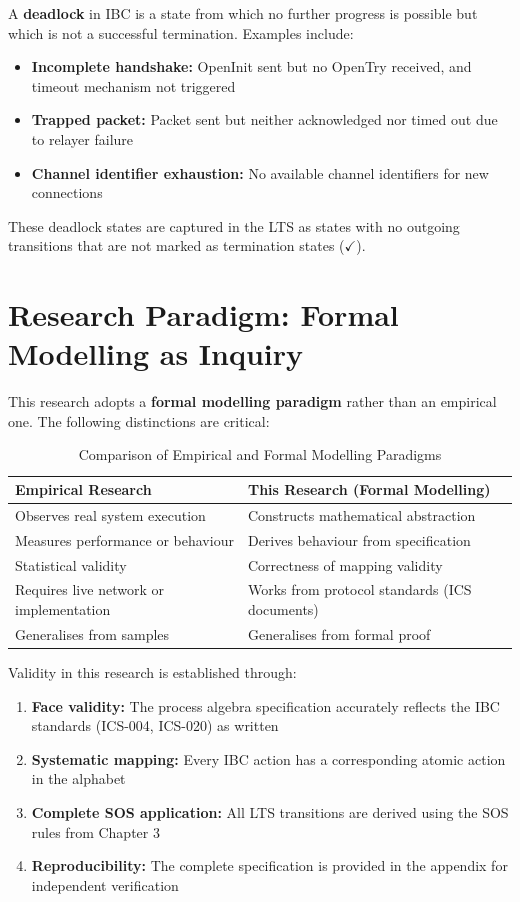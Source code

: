 A \textbf{deadlock} in IBC is a state from which no further progress is
possible but which is not a successful termination. Examples include:

\begin{itemize}
    \item \textbf{Incomplete handshake:} OpenInit sent but no OpenTry received, and timeout mechanism not triggered
    \item \textbf{Trapped packet:} Packet sent but neither acknowledged nor timed out due to relayer failure
    \item \textbf{Channel identifier exhaustion:} No available channel identifiers for new connections
\end{itemize}

These deadlock states are captured in the LTS as states with no outgoing
transitions that are not marked as termination states (\(\checkmark\)).

\section{Research Paradigm: Formal Modelling as
Inquiry}\label{research-paradigm-formal-modelling-as-inquiry}

This research adopts a \textbf{formal modelling paradigm} rather than an
empirical one. The following distinctions are critical:

\begin{table}[h]
\centering
\begin{tabular}{|l|l|}
\hline
\textbf{Empirical Research} & \textbf{This Research (Formal Modelling)} \\
\hline
Observes real system execution & Constructs mathematical abstraction \\
Measures performance or behaviour & Derives behaviour from specification \\
Statistical validity & Correctness of mapping validity \\
Requires live network or implementation & Works from protocol standards (ICS documents) \\
Generalises from samples & Generalises from formal proof \\
\hline
\end{tabular}
\caption{Comparison of Empirical and Formal Modelling Paradigms}
\end{table}

Validity in this research is established through:

\begin{enumerate}
    \item \textbf{Face validity:} The process algebra specification accurately reflects the IBC standards (ICS-004, ICS-020) as written
    \item \textbf{Systematic mapping:} Every IBC action has a corresponding atomic action in the alphabet
    \item \textbf{Complete SOS application:} All LTS transitions are derived using the SOS rules from Chapter 3
    \item \textbf{Reproducibility:} The complete specification is provided in the appendix for independent verification
\end{enumerate}


